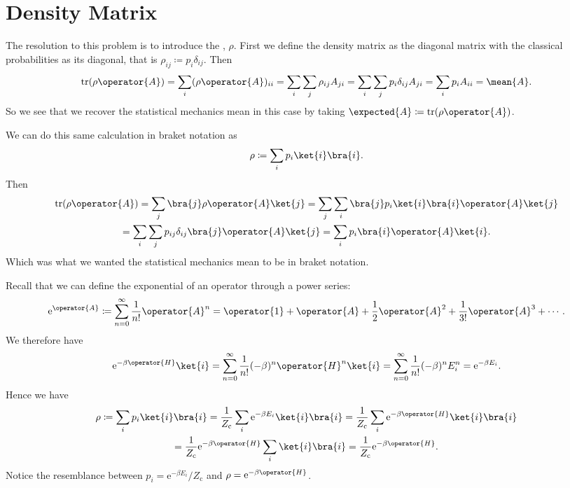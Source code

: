 \documentclass[fleqn]{NotesClass}
\newcommand*{\cpartition}{Z_{\mathrm{c}}}
\newcommand*{\e}{\mathrm{e}}
\DeclareMathOperator{\tr}{tr}
\begin{document}
    \section{Density Matrix}
    The resolution to this problem is to introduce the , \(\rho\).
    First we define the density matrix as the diagonal matrix with the classical probabilities as its diagonal, that is \(\rho_{ij} \coloneqq p_i\delta_{ij}\).
    Then
    \begin{equation}
        \tr(\rho\operator{A}) = \sum_i (\rho\operator{A})_{ii} = \sum_i \sum_j \rho_{ij}A_{ji} = \sum_i\sum_j p_i \delta_{ij}A_{ji} = \sum_{i} p_i A_{ii} = \mean{A}.
    \end{equation}
    So we see that we recover the statistical mechanics mean in this case by taking \(\expected{A} \coloneqq \tr(\rho\operator{A})\).
    
    We can do this same calculation in braket notation as
    \begin{equation}
        \rho \coloneqq \sum_i p_i \ket{i}\bra{i}.
    \end{equation}
    Then
    \begin{multline}
        \tr(\rho\operator{A}) = \sum_j \bra{j} \rho\operator{A}\ket{j} = \sum_j \sum_i \bra{j} p_i \ket{i}\bra{i} \operator{A} \ket{j}\\
        = \sum_i \sum_j p_{ij} \delta_{ij} \bra{j}\operator{A}\ket{j} = \sum_i p_i \bra{i} \operator{A} \ket{i}.
    \end{multline}
    Which was what we wanted the statistical mechanics mean to be in braket notation.
    
    Recall that we can define the exponential of an operator through a power series:
    \begin{equation}
        \e^{\operator{A}} \coloneqq \sum_{n = 0}^{\infty} \frac{1}{n!} \operator{A}^n = \operator{1} + \operator{A} + \frac{1}{2}\operator{A}^2 + \frac{1}{3!}\operator{A}^3 + \dotsb.
    \end{equation}
    We therefore have
    \begin{equation}
        \e^{-\beta\operator{H}}\ket{i} = \sum_{n=0}^{\infty} \frac{1}{n!} (-\beta)^n \operator{H}^n \ket{i} = \sum_{n = 0}^{\infty} \frac{1}{n!} (-\beta)^n E_i^n = \e^{-\beta E_i}.
    \end{equation}
    Hence we have
    \begin{multline}
        \rho \coloneqq \sum_i p_i \ket{i}\bra{i} = \frac{1}{\cpartition}\sum_i \e^{-\beta E_i}\ket{i}\bra{i} = \frac{1}{\cpartition} \sum_i \e^{-\beta\operator{H}}\ket{i}\bra{i}\\
        = \frac{1}{\cpartition} \e^{-\beta\operator{H}} \sum_{i} \ket{i}\bra{i} = \frac{1}{\cpartition} \e^{-\beta\operator{H}}.
    \end{multline}
    Notice the resemblance between \(p_i = \e^{-\beta E_i}/\cpartition\) and \(\rho = \e^{-\beta \operator{H}}\).
    
\end{document}
